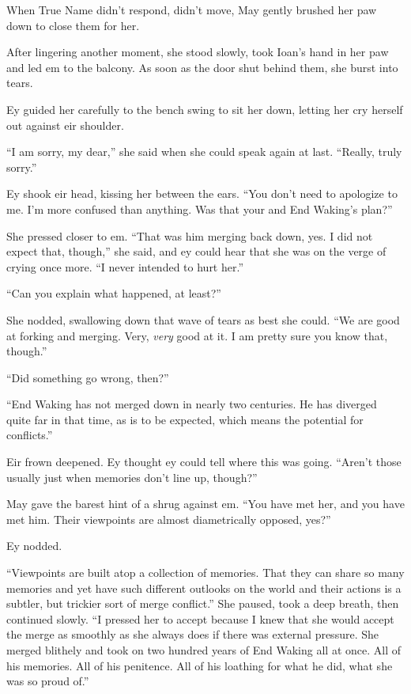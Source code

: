 When True Name didn't respond, didn't move, May gently brushed her paw down to close them for her.

After lingering another moment, she stood slowly, took Ioan's hand in her paw and led em to the balcony. As soon as the door shut behind them, she burst into tears.

Ey guided her carefully to the bench swing to sit her down, letting her cry herself out against eir shoulder.

``I am sorry, my dear,'' she said when she could speak again at last. ``Really, truly sorry.''

Ey shook eir head, kissing her between the ears. ``You don't need to apologize to me. I'm more confused than anything. Was that your and End Waking's plan?''

She pressed closer to em. ``That was him merging back down, yes. I did not expect that, though,'' she said, and ey could hear that she was on the verge of crying once more. ``I never intended to hurt her.''

``Can you explain what happened, at least?''

She nodded, swallowing down that wave of tears as best she could. ``We are good at forking and merging. Very, \emph{very} good at it. I am pretty sure you know that, though.''

``Did something go wrong, then?''

``End Waking has not merged down in nearly two centuries. He has diverged quite far in that time, as is to be expected, which means the potential for conflicts.''

Eir frown deepened. Ey thought ey could tell where this was going. ``Aren't those usually just when memories don't line up, though?''

May gave the barest hint of a shrug against em. ``You have met her, and you have met him. Their viewpoints are almost diametrically opposed, yes?''

Ey nodded.

``Viewpoints are built atop a collection of memories. That they can share so many memories and yet have such different outlooks on the world and their actions is a subtler, but trickier sort of merge conflict.'' She paused, took a deep breath, then continued slowly. ``I pressed her to accept because I knew that she would accept the merge as smoothly as she always does if there was external pressure. She merged blithely and took on two hundred years of End Waking all at once. All of his memories. All of his penitence. All of his loathing for what he did, what she was so proud of.''

